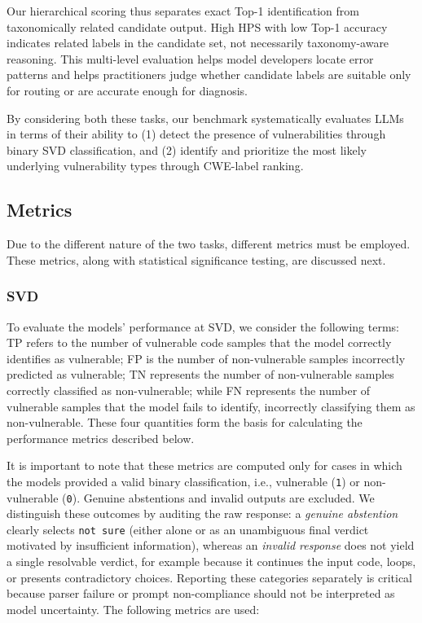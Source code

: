 \documentclass[lettersize,journal]{IEEEtran}
\begin{document}
Our hierarchical scoring thus separates exact Top-1 identification from taxonomically related candidate output. High HPS with low Top-1 accuracy indicates related labels in the candidate set, not necessarily taxonomy-aware reasoning.
This multi-level evaluation helps model developers locate error patterns and helps practitioners judge whether candidate labels are suitable only for routing or are accurate enough for diagnosis.

By considering both these tasks, our benchmark systematically evaluates \glspl{LLM} in terms of their ability to (1) detect the presence of vulnerabilities through binary \gls{SVD} classification, and (2) identify and prioritize the most likely underlying vulnerability types through \gls{CWE}-label ranking.

\subsection{Metrics}
\label{section:metrics}

Due to the different nature of the two tasks, different metrics must be employed. These metrics, along with statistical significance testing, are discussed next. 

\subsubsection{SVD}

To evaluate the models' performance at \gls{SVD}, we consider the following terms: \gls{TP} refers to the number of vulnerable code samples that the model correctly identifies as vulnerable; \gls{FP} is the number of non-vulnerable samples incorrectly predicted as vulnerable; \gls{TN} represents the number of non-vulnerable samples correctly classified as non-vulnerable; while \gls{FN} represents the number of vulnerable samples that the model fails to identify, incorrectly classifying them as non-vulnerable. These four quantities form the basis for calculating the performance metrics described below.

It is important to note that these metrics are computed only for cases in which the models provided a valid binary classification, i.e., vulnerable (\texttt{1}) or non-vulnerable (\texttt{0}). Genuine abstentions and invalid outputs are excluded. We distinguish these outcomes by auditing the raw response: a \emph{genuine abstention} clearly selects \texttt{not sure} (either alone or as an unambiguous final verdict motivated by insufficient information), whereas an \emph{invalid response} does not yield a single resolvable verdict, for example because it continues the input code, loops, or presents contradictory choices. Reporting these categories separately is critical because parser failure or prompt non-compliance should not be interpreted as model uncertainty. The following metrics are used:
\end{document}
